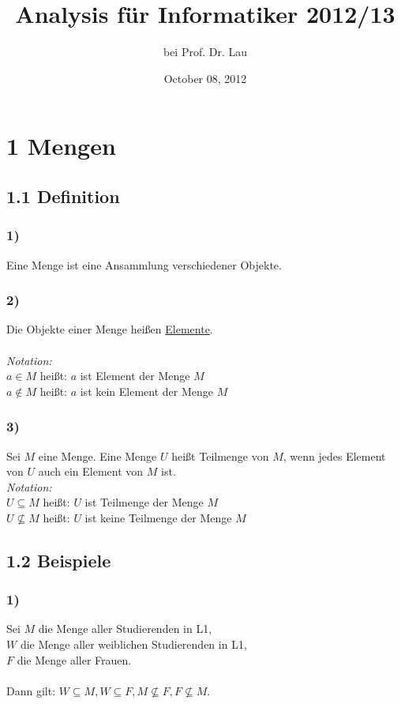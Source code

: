 \documentclass[11pt, oneside, a4paper]{article}
\begin{document}
\begin{titlepage}
\title{Analysis für Informatiker 2012/13}
\author{bei Prof. Dr. Lau}
\date{October 08, 2012}
\maketitle
\end{titlepage}
\newpage
\tableofcontents
\newpage
\section*{1 Mengen}
\subsection*{1.1 Definition}
\subsubsection*{1)}
Eine Menge ist eine Ansammlung verschiedener Objekte.
\subsubsection*{2)}
Die Objekte einer Menge heißen \underline{Elemente}. \\ \\
\textit{Notation:} \\
$a \in M$ heißt: $a$ ist Element der Menge $M$ \\
$a \notin M$ heißt: $a$ ist kein Element der Menge $M$
\subsubsection*{3)}
Sei $M$ eine Menge. Eine Menge $U$ heißt Teilmenge von $M$, wenn jedes Element von $U$ auch ein Element von $M$ ist. \\
\textit{Notation:} \\
$U \subseteq M$ heißt: $U$ ist Teilmenge der Menge $M$ \\
$U \not \subseteq M$ heißt: $U$ ist keine Teilmenge der Menge $M$
\subsection*{1.2 Beispiele}
\subsubsection*{1)}
Sei $M$ die Menge aller Studierenden in L1, \\
$W$ die Menge aller weiblichen Studierenden in L1, \\
$F$ die Menge aller Frauen. \\ \\
Dann gilt: $W \subseteq M, W \subseteq F, M \not \subseteq F, F \not \subseteq M$.
\end{document}
